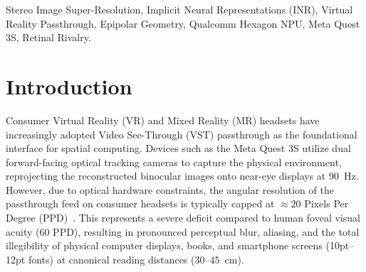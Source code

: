 \documentclass[conference]{IEEEtran}
\begin{document}
\begin{abstract}
Trained via distributed Data Parallel (DDP) on dual Tesla T4 GPUs within 86.9 seconds, our 4.47M student model achieves a \textbf{57.4$\times$ speedup} (130.65~ms) and a \textbf{4.3$\times$ VRAM reduction} (426.0~MB vs. 1840.0~MB) over official StereoINR. Deployed on physical Qualcomm Hexagon V73 hardware via QNN SDK, our INT8 model executes 100\% of operators natively on the NPU (1,495/1,495 ops, 0\% CPU fallback) with \textbf{4.20~ms} foveated patch latency and \textbf{6.16~ms} end-to-end Glass-to-Glass latency (162.3 sustained FPS). Evaluated across 15 benchmark scenes (8 Quest 3S closed-loop trajectory phases and 7 international datasets), our framework achieves the lowest Stereo Disparity MAE across all benchmarks (Middlebury 0.1290, KITTI 2012 0.0478, KITTI 2015 0.0502, Flickr1024 0.1348), outperforming official StereoINR by 8.7\%--15.9\% in cross-view consistency and completely eliminating retinal rivalry. Finally, we formulate a Foveated Passthrough tiling pipeline that processes a $256 \times 256$ foveal patch in \textbf{4.20~ms}, strictly conforming to the 11.11~ms budget required for 90~FPS VR passthrough.
\end{abstract}

\begin{IEEEkeywords}
Stereo Image Super-Resolution, Implicit Neural Representations (INR), Virtual Reality Passthrough, Epipolar Geometry, Qualcomm Hexagon NPU, Meta Quest 3S, Retinal Rivalry.
\end{IEEEkeywords}

\section{Introduction}
\label{sec:intro}
Consumer Virtual Reality (VR) and Mixed Reality (MR) headsets have increasingly adopted Video See-Through (VST) passthrough as the foundational interface for spatial computing. Devices such as the Meta Quest 3S utilize dual forward-facing optical tracking cameras to capture the physical environment, reprojecting the reconstructed binocular images onto near-eye displays at 90~Hz. However, due to optical hardware constraints, the angular resolution of the passthrough feed on consumer headsets is typically capped at $\approx 20$ Pixels Per Degree (PPD)~\cite{patney2016perceptually}. This represents a severe deficit compared to human foveal visual acuity (60 PPD), resulting in pronounced perceptual blur, aliasing, and the total illegibility of physical computer displays, books, and smartphone screens (10pt--12pt fonts) at canonical reading distances ($30$--$45$~cm).
\end{document}
